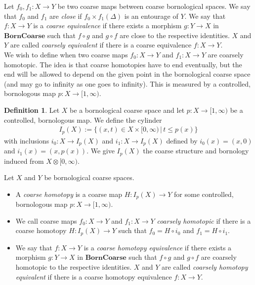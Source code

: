\documentclass[a4paper,11pt]{article}
\theoremstyle{definition}
\newtheorem{definition}{Definition}[section]
\theoremstyle{plain}
\theoremstyle{remark}
\begin{document}
Let $f_{0},f_{1}: X\rightarrow Y$ be two coarse maps between coarse bornological spaces. We say that $f_0$ and $f_1$ are \textit{close} if $f_0\times f_1 (\Delta)$ is an entourage of $Y$. We say that $f: X\rightarrow Y$ is a \textit{coarse equivalence} if there exists a morphism $g: Y\rightarrow X$ in $\mathbf{BornCoarse}$ such that $f\circ g$ and $g\circ f$ are close to the respective identities. $X$ and $Y$ are called \textit{coarsely equivalent} if there is a coarse equivalence $f: X\rightarrow Y$.  \\

We wish to define when two coarse maps $f_0:X\rightarrow Y$ and $f_{1}: X\rightarrow Y$ are coarsely homotopic. The idea is that coarse homotopies have to end eventually, but the end will be allowed to depend on the given point in the bornological coarse space (and may go to infinity as one goes to infinity). This is measured by a controlled, bornologous map $p: X \rightarrow [1,\infty)$. 

\begin{definition} Let $X$ be a bornological coarse space and let $p: X\rightarrow [1,\infty)$ be a controlled, bornologous map. We define the cylinder
\begin{align*}
I_p(X) := \{(x,t)\in X \times [0,\infty)\,|\, t\leq p(x)\}
\end{align*}
with inclusions $i_0: X\rightarrow I_p(X)$ and $i_1: X\rightarrow I_p(X)$ defined by $i_0(x) = (x,0)$ and $i_1(x) = (x,p(x))$. We give $I_{p}(X)$ the coarse structure and bornology induced from $X \otimes [0,\infty)$.
\end{definition}

Let $X$ and $Y$ be bornological coarse spaces. 
\begin{itemize}
\item A \textit{coarse homotopy} is a coarse map $H: I_p(X)\rightarrow Y$ for some controlled, bornologous map $p: X\rightarrow [1,\infty)$.
\item We call coarse maps $f_0:X\rightarrow Y$ and $f_1: X\rightarrow Y$ \textit{coarsely homotopic} if there is a coarse homotopy $H: I_p(X)\rightarrow Y$ such that $f_0 = H\circ i_0$ and $f_1 = H\circ i_1$. 
\item We say that $f: X\rightarrow Y$ is a \textit{coarse homotopy equivalence} if there exists a morphism $g: Y\rightarrow X$ in $\mathbf{BornCoarse}$ such that $f\circ g$ and $g\circ f$ are coarsely homotopic to the respective identities. $X$ and $Y$ are called \textit{coarsely homotopy equivalent} if there is a coarse homotopy equivalence $f: X\rightarrow Y$. 
\end{itemize} 
\end{document}
